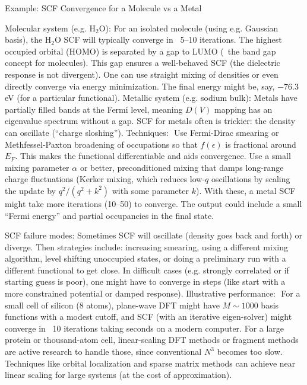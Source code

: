 \begin{frame}{Example: SCF Convergence for a Molecule vs a Metal}

Molecular system (e.g. H$_2$O): For an isolated molecule (using e.g. Gaussian basis), the H$_2$O SCF will typically converge in ~5–10 iterations. The highest occupied orbital (HOMO) is separated by a gap to LUMO (~the band gap concept for molecules). This gap ensures a well-behaved SCF (the dielectric response is not divergent). One can use straight mixing of densities or even directly converge via energy minimization. The final energy might be, say, $-76.3$ eV (for a particular functional).
Metallic system (e.g. sodium bulk): Metals have partially filled bands at the Fermi level, meaning $D(V)$ mapping has an eigenvalue spectrum without a gap. SCF for metals often is trickier: the density can oscillate (“charge sloshing”). Techniques: 
Use Fermi-Dirac smearing or Methfessel-Paxton broadening of occupations so that $f(\epsilon)$ is fractional around $E_F$. This makes the functional differentiable and aids convergence.
Use a small mixing parameter $\alpha$ or better, preconditioned mixing that damps long-range charge fluctuations (Kerker mixing, which reduces low-$q$ oscillations by scaling the update by $q^2/(q^2 + k^2)$ with some parameter $k$). With these, a metal SCF might take more iterations (10–50) to converge. The output could include a small “Fermi energy” and partial occupancies in the final state.

SCF failure modes: Sometimes SCF will oscillate (density goes back and forth) or diverge. Then strategies include: increasing smearing, using a different mixing algorithm, level shifting unoccupied states, or doing a preliminary run with a different functional to get close. In difficult cases (e.g. strongly correlated or if starting guess is poor), one might have to converge in steps (like start with a more constrained potential or damped response).
Illustrative performance: 
For a small cell of silicon (8 atoms), plane-wave DFT might have $M\sim 1000$ basis functions with a modest cutoff, and SCF (with an iterative eigen-solver) might converge in ~10 iterations taking seconds on a modern computer.
For a large protein or thousand-atom cell, linear-scaling DFT methods or fragment methods are active research to handle those, since conventional $N^3$ becomes too slow. Techniques like orbital localization and sparse matrix methods can achieve near linear scaling for large systems (at the cost of approximation). \end{frame}



